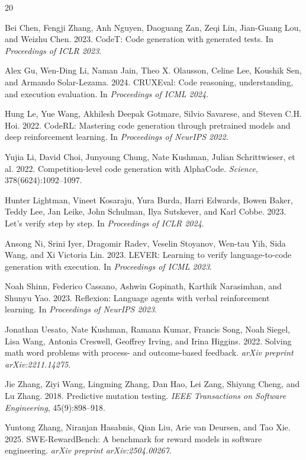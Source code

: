 \documentclass[11pt,a4paper]{article}
\begin{document}
\begin{thebibliography}{20}

Bei Chen, Fengji Zhang, Anh Nguyen, Daoguang Zan, Zeqi Lin, Jian-Guang Lou, and Weizhu Chen. 2023.
\newblock CodeT: Code generation with generated tests.
\newblock In \emph{Proceedings of ICLR 2023}.

Alex Gu, Wen-Ding Li, Naman Jain, Theo X. Olausson, Celine Lee, Koushik Sen, and Armando Solar-Lezama. 2024.
\newblock CRUXEval: Code reasoning, understanding, and execution evaluation.
\newblock In \emph{Proceedings of ICML 2024}.

Hung Le, Yue Wang, Akhilesh Deepak Gotmare, Silvio Savarese, and Steven C.H. Hoi. 2022.
\newblock CodeRL: Mastering code generation through pretrained models and deep reinforcement learning.
\newblock In \emph{Proceedings of NeurIPS 2022}.

Yujia Li, David Choi, Junyoung Chung, Nate Kushman, Julian Schrittwieser, et al. 2022.
\newblock Competition-level code generation with AlphaCode.
\newblock \emph{Science}, 378(6624):1092--1097.

Hunter Lightman, Vineet Kosaraju, Yura Burda, Harri Edwards, Bowen Baker, Teddy Lee, Jan Leike, John Schulman, Ilya Sutskever, and Karl Cobbe. 2023.
\newblock Let's verify step by step.
\newblock In \emph{Proceedings of ICLR 2024}.

Ansong Ni, Srini Iyer, Dragomir Radev, Veselin Stoyanov, Wen-tau Yih, Sida Wang, and Xi Victoria Lin. 2023.
\newblock LEVER: Learning to verify language-to-code generation with execution.
\newblock In \emph{Proceedings of ICML 2023}.

Noah Shinn, Federico Cassano, Ashwin Gopinath, Karthik Narasimhan, and Shunyu Yao. 2023.
\newblock Reflexion: Language agents with verbal reinforcement learning.
\newblock In \emph{Proceedings of NeurIPS 2023}.

Jonathan Uesato, Nate Kushman, Ramana Kumar, Francis Song, Noah Siegel, Lisa Wang, Antonia Creswell, Geoffrey Irving, and Irina Higgins. 2022.
\newblock Solving math word problems with process- and outcome-based feedback.
\newblock \emph{arXiv preprint arXiv:2211.14275}.

Jie Zhang, Ziyi Wang, Lingming Zhang, Dan Hao, Lei Zang, Shiyang Cheng, and Lu Zhang. 2018.
\newblock Predictive mutation testing.
\newblock \emph{IEEE Transactions on Software Engineering}, 45(9):898--918.

Yuntong Zhang, Niranjan Hasabnis, Qian Liu, Arie van Deursen, and Tao Xie. 2025.
\newblock SWE-RewardBench: A benchmark for reward models in software engineering.
\newblock \emph{arXiv preprint arXiv:2504.00267}.

\end{thebibliography}
\end{document}
